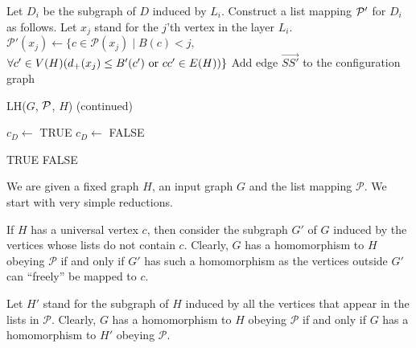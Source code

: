 \documentclass[12pt]{llncs}
\begin{document}
\begin{algorithm}
\begin{algorithmic}
        \State Let $D_i$ be the subgraph of $D$ induced by $L_i$.
                \State Construct a list mapping $\cal P'$ for $D_i$ as follows.
                  \State Let $x_j$ stand for the $j$'th
                vertex in the layer $L_i$.
                  \State $\mathcal P'(x_j) \leftarrow 
                                \{c\in\mathcal P(x_j)\mid B(c)<j, $
                                \State \hspace{\algorithmicindent}  $\forall
                                c'\in V(H)(d_+(x_j)
                               \le B'(c')\hbox{ or
                                }cc'\in E(H))\}$
                \EndFor
                      \State Add edge $\overrightarrow{SS'}$ to the
                      configuration graph
                \EndIf
             \EndFor
        \EndFor
  \end{algorithmic}
\end{algorithm}
\clearpage

\begin{algorithm}
  \ContinuedFloat
  \caption{LH($G$, $\cal P$, $H$) (continued)}
  \begin{algorithmic}
         \State $c_D \leftarrow$ TRUE
        \Else 
                 \State $c_D \leftarrow$ FALSE
        \EndIf
\EndIf
\EndFor

\Return TRUE
\Else
\Return FALSE
\EndIf
\end{algorithmic}
\end{algorithm}

We are given a fixed graph $H$, an input graph $G$ and the list mapping
$\mathcal P$. We start with very simple reductions.

If $H$ has a universal vertex $c$, then consider the subgraph $G'$ of $G$
induced by the vertices whose lists do not contain $c$. Clearly, $G$ has a
homomorphism to $H$ obeying $\mathcal P$ if and only if $G'$ has such a
homomorphism as the vertices outside $G'$ can ``freely'' be mapped to $c$.

Let $H'$ stand for the subgraph of $H$ induced by all the vertices that appear
in the lists in $\mathcal P$. Clearly, $G$ has a homomorphism to $H$ obeying
$\mathcal P$ if and only if $G$ has a homomorphism to $H'$ obeying $\mathcal
P$.
\end{document}
